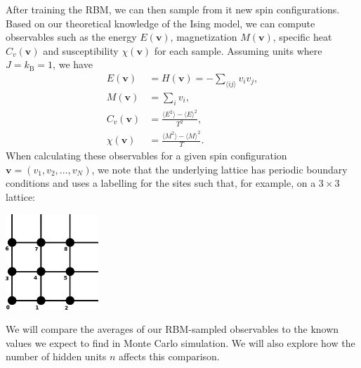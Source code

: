 \documentclass[letterpaper]{scrartcl}
\begin{document}
After training the RBM, we can then sample from it new spin configurations.
Based on our theoretical knowledge of the Ising model, we can compute observables such as 
the energy $E(\mathbf{v})$, magnetization $M(\mathbf{v})$, specific heat $C_v(\mathbf{v})$ and susceptibility $\chi(\mathbf{v})$ for each sample.
Assuming units where $J = k_\text{B} = 1$, we have
\begin{align*}
E(\mathbf{v}) &= H(\mathbf{v}) = -\sum_{\langle i j \rangle} v_i v_j, \\
M(\mathbf{v}) &= \sum_i v_i , \\
C_v(\mathbf{v}) &= \frac{\langle E^2 \rangle - \langle E \rangle^2}{T^2}, \\
\chi(\mathbf{v}) &= \frac{\langle M^2 \rangle - \langle M \rangle^2}{T}.
\end{align*}
When calculating these observables for a given spin configuration $\mathbf{v} = (v_1, v_2, \ldots, v_N)$, we note that the underlying lattice has periodic boundary conditions and uses a labelling for the sites such that, for example, on a $3\times 3$ lattice:
\begin{center}
\includegraphics[width=3.5cm]{lattice.pdf}
\end{center}
We will compare the averages of our RBM-sampled observables to the known values we expect to find in Monte Carlo simulation.
We will also explore how the number of hidden units $n$ affects this comparison.

\end{document}
